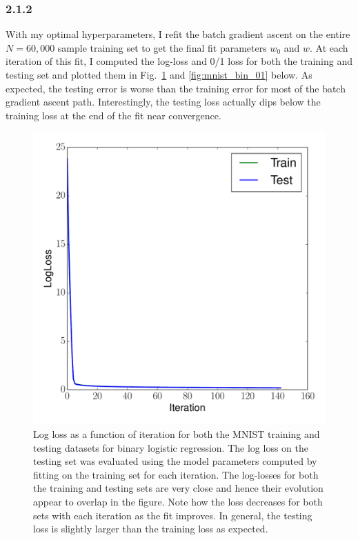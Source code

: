 \documentclass[12pt]{amsart}
\begin{document}
\subsubsection*{2.1.2}
With my optimal hyperparameters, I refit the batch gradient ascent on the entire $N = 60,000$ sample training set to get the final fit parameters $w_0$ and $\hat{w}$.  At each iteration of this fit, I computed the log-loss and 0/1 loss for both the training and testing set and plotted them in Fig.~\ref{fig:mnist_bin_ll} and \ref{fig:mnist_bin_01} below.  As expected, the testing error is worse than the training error for most of the batch gradient ascent path.  Interestingly, the testing loss actually dips below the training loss at the end of the fit near convergence.
\begin{figure}[H]
	\includegraphics[width=\columnwidth]{mnist_bin_train_test_ll.pdf}
    \caption{Log loss as a function of iteration for both the MNIST training and testing datasets for binary logistic regression.  The log loss on the testing set was evaluated using the model parameters computed by fitting on the training set for each iteration.  The log-losses for both the training and testing sets are very close and hence their evolution appear to overlap in the figure. Note how the loss decreases for both sets with each iteration as the fit improves.  In general, the testing loss is slightly larger than the training loss as expected.}
    \label{fig:mnist_bin_ll}
\end{figure}
\end{document}
